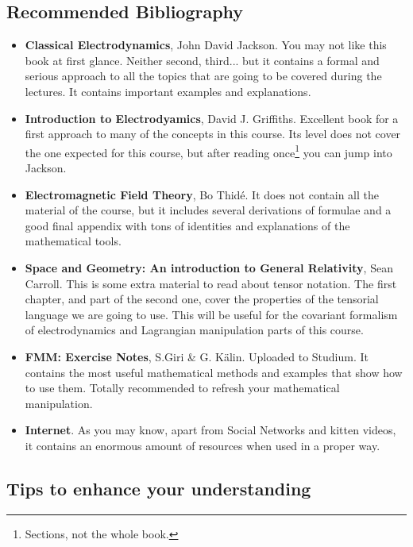 \documentclass[a4paper,12pt]{article}
\numberwithin{equation}{subsection}
\begin{document}
\subsection{Recommended Bibliography}
\begin{itemize}
	\item \textbf{Classical Electrodynamics}, John David Jackson. You may not like this book at first glance. Neither second, third... but it contains a formal and serious approach to all the topics that are going to be covered during the lectures. It contains important examples and explanations.
	
	\item \textbf{Introduction to Electrodyamics}, David J. Griffiths. Excellent book for a first approach to many of the concepts in this course. Its level does not cover the one expected for this course, but after reading once\footnote{Sections, not the whole book.} you can jump into Jackson.
	
	\item \textbf{Electromagnetic Field Theory}, Bo Thidé. It does not contain all the material of the course, but it includes several derivations of formulae and a good final appendix with tons of identities and explanations of the mathematical tools.
	
	\item \textbf{Space and Geometry: An introduction to General Relativity}, Sean Carroll. This is some extra material to read about tensor notation. The first chapter, and part of the second one, cover the properties of the tensorial language we are going to use. This will be useful for the covariant formalism of electrodynamics and Lagrangian manipulation parts of this course.
	
	\item \textbf{FMM: Exercise Notes}, S.Giri \& G. Kälin. Uploaded to Studium. It contains the most useful mathematical methods and examples that show how to use them. Totally recommended to refresh your mathematical manipulation.
	
	\item \textbf{Internet}. As you may know, apart from Social Networks and kitten videos, it contains an enormous amount of resources when used in a proper way.
	
\end{itemize}

\subsection{Tips to enhance your understanding}
\end{document}
